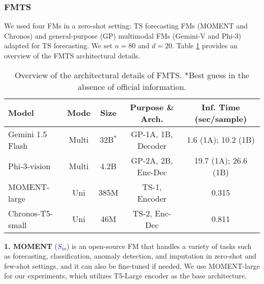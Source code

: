\subsubsection{FMTS}
\label{sec:systems}

We used four FMs in a zero-shot setting: TS forecasting FMs (MOMENT and Chronos) and general-purpose (GP) multimodal FMs (Gemini-V and Phi-3) adapted for TS forecasting. We set $n=80$ and $d=20$. Table \ref{tab:fms} provides an overview of the FMTS architectural details.

\begin{table}[htb]
\centering
   {\tiny
    \begin{tabular}{|l|c|c|c|c|}
    \hline
          {\bf Model} &    
          {\bf Mode} & 
          {\bf Size} &
          {\bf Purpose} \&
          {\bf Arch.} &
          {\bf Inf. Time (sec/sample)} \\ \hline 

          Gemini 1.5 Flash &
          Multi &
          32B$^*$ &
          GP-1A, 1B,
          Decoder &
          1.6 (1A); 10.2 (1B)
          \\ \hline
          Phi-3-vision &
          Multi &
          4.2B &
          GP-2A, 2B,
          Enc-Dec &
          19.7 (1A); 26.6 (1B) 
          \\ \hline
          MOMENT-large &
          Uni &
          385M &
          TS-1,
          Encoder &
          0.315
          \\ \hline
          Chronos-T5-small &
          Uni &
          46M &
          TS-2,
          Enc-Dec &
          0.811
          \\ \hline 
    \end{tabular}
    }
    \caption{
    Overview of the architectural details of FMTS. *Best guess in the absence of official information.
    }
    \label{tab:fms}
    \vspace{-1em}
\end{table}

\noindent \textbf{1. MOMENT} (\textcolor{blue}{$S_m$}) \cite{goswami2024moment} is an open-source FM that handles a variety of tasks such as forecasting, classification, anomaly detection, and imputation in zero-shot and few-shot settings, and it can also be fine-tuned if needed. We use MOMENT-large for our experiments, which utilizes T5-Large encoder \cite{raffel2020exploring} as the base architecture. 

